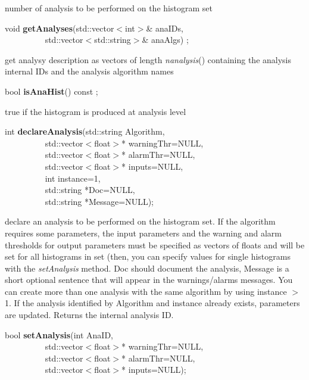  number of analysis to be performed on the histogram set


\item    void {\bf getAnalyses}(std::vector$<$int$>$\& anaIDs,\\\mbox{}~~~~~~~~~
		   std::vector$<$std::string$>$\& anaAlgs) ;

 get analysy description as vectors of length {\it  nanalysis}() containing 
 the analysis internal IDs and the analysis algorithm names


\item    bool {\bf isAnaHist}() const ;

 true if the histogram is produced at analysis level


\item    int {\bf declareAnalysis}(std::string Algorithm,\\\mbox{}~~~~~~~~~ 
                      std::vector$<$float$>$* warningThr=NULL,\\\mbox{}~~~~~~~~~ 
                      std::vector$<$float$>$* alarmThr=NULL,\\\mbox{}~~~~~~~~~ 
                      std::vector$<$float$>$* inputs=NULL,\\\mbox{}~~~~~~~~~ 
                      int instance=1,\\\mbox{}~~~~~~~~~
                      std::string *Doc=NULL,\\\mbox{}~~~~~~~~~
                      std::string *Message=NULL);

 declare an analysis to be performed on the histogram set. If the algorithm
 requires some parameters, the input parameters and the warning and alarm 
 thresholds for output parameters must be
 specified as vectors of floats and will be set for all histograms in
 set (then, you can specify values for single histograms with the {\it
 setAnalysis} method. Doc should document the analysis, Message is a short
 optional sentence that will appear in the warnings/alarms messages.
 You can create more than one analysis
 with the same algorithm by using instance $>$ 1. If the analysis
 identified by Algorithm and instance already exists, parameters are
 updated. Returns the internal analysis ID.


\item    bool {\bf setAnalysis}(int AnaID,\\\mbox{}~~~~~~~~~ 
                   std::vector$<$float$>$* warningThr=NULL,\\\mbox{}~~~~~~~~~ 
                   std::vector$<$float$>$* alarmThr=NULL,\\\mbox{}~~~~~~~~~ 
                   std::vector$<$float$>$* inputs=NULL);

